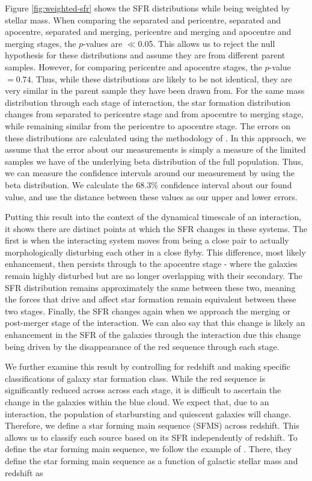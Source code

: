Figure \ref{fig:weighted-sfr} shows the SFR distributions while being weighted by stellar mass. When comparing the separated and pericentre, separated and apocentre, separated and merging, pericentre and merging and apocentre and merging stages, the $p$-values are $\ll$0.05. This allows us to reject the null hypothesis for these distributions and assume they are from different parent samples. However, for comparing pericentre and apocentre stages, the $p$-value$=0.74$. Thus, while these distributions are likely to be not identical, they are very similar in the parent sample they have been drawn from. For the same mass distribution through each stage of interaction, the star formation distribution changes from separated to pericentre stage and from apocentre to merging stage, while remaining similar from the pericentre to apocentre stage. The errors on these distributions are calculated using the methodology of \citet{2011PASA...28..128C}. In this approach, we assume that the error about our measurements is simply a measure of the limited samples we have of the underlying beta distribution of the full population. Thus, we can measure the confidence intervals around our measurement by using the beta distribution. We calculate the 68.3\% confidence interval about our found value, and use the distance between these values as our upper and lower errors.

Putting this result into the context of the dynamical timescale of an interaction, it shows there are distinct points at which the SFR changes in these systems. The first is when the interacting system moves from being a close pair to actually morphologically disturbing each other in a close flyby. This difference, most likely enhancement, then persists through to the apocentre stage - where the galaxies remain highly disturbed but are no longer overlapping with their secondary. The SFR distribution remains approximately the same between these two, meaning the forces that drive and affect star formation remain equivalent between these two stages. Finally, the SFR changes again when we approach the merging or post-merger stage of the interaction. We can also say that this change is likely an enhancement in the SFR of the galaxies through the interaction due this change being driven by the disappearance of the red sequence through each stage.

We further examine this result by controlling for redshift and making specific classifications of galaxy star formation class. While the red sequence is significantly reduced across across each stage, it is difficult to ascertain the change in the galaxies within the blue cloud. We expect that, due to an interaction, the population of starbursting and quiescent galaxies will change. Therefore, we define a star forming main sequence (SFMS) across redshift. This allows us to classify each source based on its SFR independently of redshift. To define the star forming main sequence, we follow the example of \citet{2019MNRAS.484.4360A}. There, they define the star forming main sequence as a function of galactic stellar mass and redshift as

